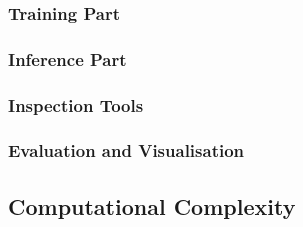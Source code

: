 \documentclass[11pt,twoside]{article}
\newtheorem{Proposition}{Proposition}
\numberwithin{Theorem}{section}
\numberwithin{Definition}{section}
\numberwithin{Lemma}{section}
\numberwithin{Algorithm}{section}
\numberwithin{equation}{section}
\begin{document}
\subsubsection{Training Part}

\subsubsection{Inference Part}

\subsubsection{Inspection Tools}

\subsubsection{Evaluation and Visualisation}

\subsection{Computational Complexity}



\end{document}
